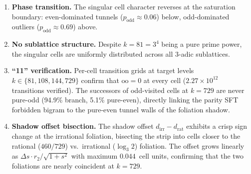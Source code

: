 \documentclass[11pt,a4paper]{article}
\theoremstyle{plain}
\theoremstyle{definition}
\begin{document}
\begin{mainresult}
\begin{enumerate}[label=(\roman*)]
        \item \textbf{Phase transition.}  The singular cell character
        reverses at the saturation boundary: even-dominated tunnels
        ($p_{\mathrm{odd}} \approx 0.06$) below, odd-dominated outliers
        ($p_{\mathrm{odd}} \approx 0.69$) above.

        \item \textbf{No sublattice structure.}  Despite $k = 81 = 3^4$
        being a pure prime power, the singular cells are uniformly
        distributed across all 3-adic sublattices.

        \item \textbf{``11'' verification.}  Per-cell transition grids at
        target levels $k \in \{81, 108, 144, 729\}$ confirm that
        $\mathrm{oo} = 0$ at every cell ($2.27 \times 10^{12}$ transitions
        verified).  The successors of odd-visited cells at $k = 729$ are
        never pure-odd (94.9\% branch, 5.1\% pure-even), directly linking
        the parity SFT forbidden bigram to the pure-even tunnel walls of
        the foliation shadow.

        \item \textbf{Shadow offset bisection.}  The shadow offset
        $d_{\mathrm{irr}} - d_{\mathrm{rat}}$ exhibits a crisp sign
        change at the irrational foliation, bisecting the strip into cells
        closer to the rational ($460/729$) vs.\ irrational ($\log_3 2$)
        foliation.  The offset grows linearly as
        $\Delta s \cdot r_2 / \sqrt{1 + s^2}$ with maximum $0.044$~cell
        units, confirming that the two foliations are nearly coincident at
        $k = 729$.
    \end{enumerate}
\end{mainresult}
\end{document}
